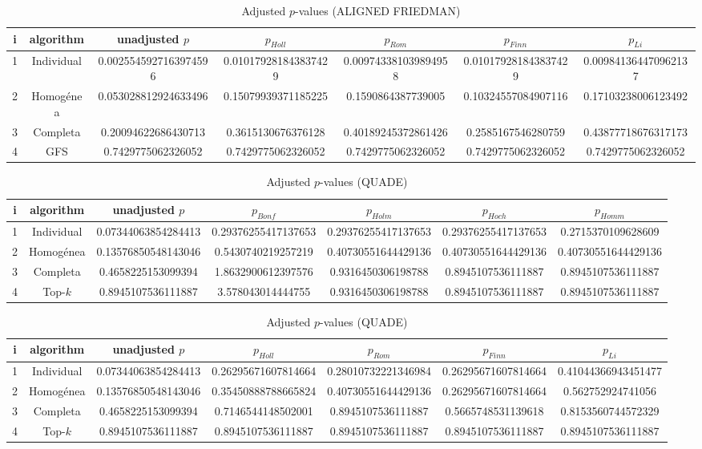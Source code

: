 \documentclass[a4paper,10pt]{article}
\begin{document}
\begin{landscape}
\begin{table}[!htp]
\centering\scriptsize
\caption{Adjusted $p$-values (ALIGNED FRIEDMAN)}
\begin{tabular}{ccccccc}
i&algorithm&unadjusted $p$&$p_{Holl}$&$p_{Rom}$&$p_{Finn}$&$p_{Li}$\\
\hline
1&Individual&0.0025545927163974596&0.010179281843837429&0.009743381039894958&0.010179281843837429&0.009841364470962137\\
2&Homogénea&0.053028812924633496&0.15079939371185225&0.1590864387739005&0.10324557084907116&0.17103238006123492\\
3&Completa&0.20094622686430713&0.3615130676376128&0.40189245372861426&0.2585167546280759&0.43877718676317173\\
4&GFS&0.7429775062326052&0.7429775062326052&0.7429775062326052&0.7429775062326052&0.7429775062326052\\
\hline
\end{tabular}
\end{table}


\newpage

\begin{table}[!htp]
\centering\scriptsize
\caption{Adjusted $p$-values (QUADE)}
\begin{tabular}{ccccccc}
i&algorithm&unadjusted $p$&$p_{Bonf}$&$p_{Holm}$&$p_{Hoch}$&$p_{Homm}$\\
\hline
1&Individual&0.07344063854284413&0.29376255417137653&0.29376255417137653&0.29376255417137653&0.2715370109628609\\
2&Homogénea&0.13576850548143046&0.5430740219257219&0.40730551644429136&0.40730551644429136&0.40730551644429136\\
3&Completa&0.4658225153099394&1.8632900612397576&0.9316450306198788&0.8945107536111887&0.8945107536111887\\
4&Top-$k$&0.8945107536111887&3.578043014444755&0.9316450306198788&0.8945107536111887&0.8945107536111887\\
\hline
\end{tabular}
\end{table}

\begin{table}[!htp]
\centering\scriptsize
\caption{Adjusted $p$-values (QUADE)}
\begin{tabular}{ccccccc}
i&algorithm&unadjusted $p$&$p_{Holl}$&$p_{Rom}$&$p_{Finn}$&$p_{Li}$\\
\hline
1&Individual&0.07344063854284413&0.26295671607814664&0.28010732221346984&0.26295671607814664&0.41044366943451477\\
2&Homogénea&0.13576850548143046&0.35450888788665824&0.40730551644429136&0.26295671607814664&0.562752924741056\\
3&Completa&0.4658225153099394&0.7146544148502001&0.8945107536111887&0.5665748531139618&0.8153560744572329\\
4&Top-$k$&0.8945107536111887&0.8945107536111887&0.8945107536111887&0.8945107536111887&0.8945107536111887\\
\hline
\end{tabular}
\end{table}

\end{landscape}
\end{document}
